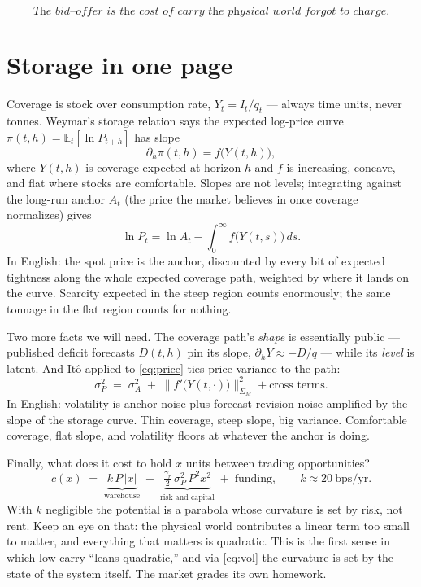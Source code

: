 \documentclass[11pt]{article}
\begin{document}
\begin{equation}
\textit{The bid--offer is the cost of carry the physical world forgot to charge.}
\label{eq:slogan}
\end{equation}

\section{Storage in one page}\label{sec:storage}

Coverage is stock over consumption rate, $Y_t = I_t/q_t$ --- always time units, never tonnes. Weymar's storage relation says the expected log-price curve $\pi(t,h) = \mathbb{E}_t[\ln P_{t+h}]$ has slope
\begin{equation}
\partial_h \pi(t,h) = f\big(Y(t,h)\big),
\label{eq:storage}
\end{equation}
where $Y(t,h)$ is coverage expected at horizon $h$ and $f$ is increasing, concave, and flat where stocks are comfortable. Slopes are not levels; integrating against the long-run anchor $A_t$ (the price the market believes in once coverage normalizes) gives
\begin{equation}
\ln P_t = \ln A_t - \int_0^\infty f\big(Y(t,s)\big)\,ds .
\label{eq:price}
\end{equation}
In English: the spot price is the anchor, discounted by every bit of expected tightness along the whole expected coverage path, weighted by where it lands on the curve. Scarcity expected in the steep region counts enormously; the same tonnage in the flat region counts for nothing.

Two more facts we will need. The coverage path's \emph{shape} is essentially public --- published deficit forecasts $D(t,h)$ pin its slope, $\partial_h Y \approx -D/q$ --- while its \emph{level} is latent. And It\^o applied to \eqref{eq:price} ties price variance to the path:
\begin{equation}
\sigma_P^2 \;=\; \sigma_A^2 \;+\; \big\|f'\big(Y(t,\cdot)\big)\big\|^2_{\Sigma_M} + \text{cross terms}.
\label{eq:vol}
\end{equation}
In English: volatility is anchor noise plus forecast-revision noise amplified by the slope of the storage curve. Thin coverage, steep slope, big variance. Comfortable coverage, flat slope, and volatility floors at whatever the anchor is doing.

Finally, what does it cost to hold $x$ units between trading opportunities?
\begin{equation}
c(x) \;=\; \underbrace{k\,P\,|x|}_{\text{warehouse}} \;+\; \underbrace{\tfrac{\gamma_r}{2}\,\sigma_P^2\,P^2 x^2}_{\text{risk and capital}} \;+\; \text{funding},
\qquad k \approx 20\ \text{bps/yr}.
\label{eq:cost}
\end{equation}
With $k$ negligible the potential is a parabola whose curvature is set by risk, not rent. Keep an eye on that: the physical world contributes a linear term too small to matter, and everything that matters is quadratic. This is the first sense in which low carry ``leans quadratic,'' and via \eqref{eq:vol} the curvature is set by the state of the system itself. The market grades its own homework.
\end{document}
